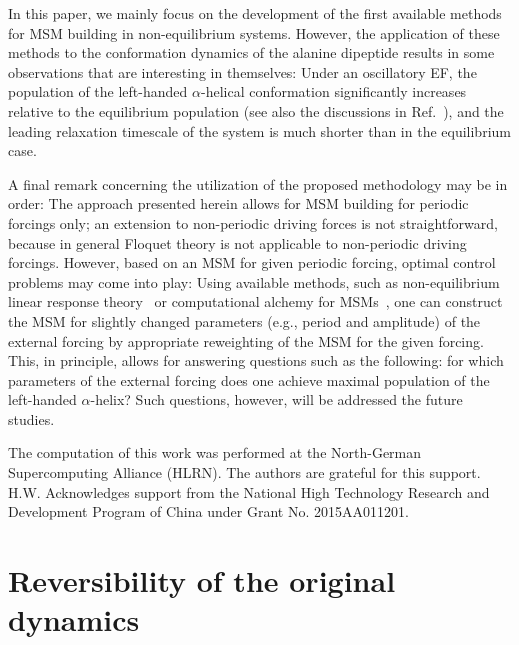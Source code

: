 \documentclass[journal=jctcce,manuscript=article]{achemso}
\newcommand{\redrevision}[1]{{\color{red} #1}}
\begin{document}
In this paper, we mainly focus on the development of the first available methods for MSM
building in non-equilibrium systems.
However, the application of these methods to the conformation dynamics of the alanine dipeptide results in some observations that are interesting in themselves: Under an
oscillatory EF, the population of the left-handed $\alpha$-helical conformation
significantly increases relative to the equilibrium population
(see also the discussions in Ref.~\cite{wang2014exploring}),
and the leading relaxation timescale of the system is much shorter than in the equilibrium case.

A final remark concerning the utilization of the proposed methodology may be in order: 
\redrevision{
The approach presented herein allows for MSM building for periodic forcings only; an extension
to non-periodic driving forces is not straightforward, because in
general Floquet theory is not applicable to non-periodic driving
forcings. However,}
based on an MSM for given periodic forcing, optimal control problems may come into play:
Using available methods, such as non-equilibrium
linear response theory~\cite{wang2013linear} or computational alchemy for MSMs~\cite{schutte2014markov}, one can construct the MSM for slightly changed parameters (e.g., period and amplitude) of the external forcing by appropriate reweighting of the MSM for the given forcing. This, in principle, allows for  answering questions such as the following:
for which parameters of the external forcing does one achieve maximal population of  the left-handed $\alpha$-helix?
Such questions, however, will
be addressed the future studies.


\begin{acknowledgement}

The computation of this work was performed at the North-German Supercomputing Alliance (HLRN). The authors are grateful for this support.
H.W. Acknowledges support from the National High Technology Research and Development
Program of China under Grant No. 2015AA011201.
\end{acknowledgement}


\appendix

\section{Reversibility of the original dynamics}
\label{sec:app-revs}
\end{document}
